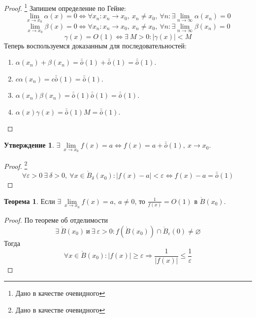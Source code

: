 \documentclass[a4paper, 12pt]{article}
\newcommand{\Bo}{\mathring{B}}
\renewcommand{\epsilon}{\varepsilon}
\renewcommand{\emptyset}{\varnothing}
\newcommand{\om}{\bar{\bar{o}}}
\theoremstyle{definition}
\newtheorem*{theorem}{Теорема}
\newtheorem*{statement}{Утверждение}
\begin{document}
        \begin{proof}\footnote{Дано в качестве очевидного}
            Запишем определение по Гейне:
            \[\lim\limits_{x\to x_0}\alpha(x)=0 \Leftrightarrow \forall x_n: x_n\to x_0,\ x_n\ne x_0,\ \forall n: \exists \lim\limits_{n\to \infty}\alpha(x_n)=0\]
            \[\lim\limits_{x\to x_0}\beta(x)=0 \Leftrightarrow \forall x_n: x_n\to x_0,\ x_n\ne x_0,\ \forall n: \exists \lim\limits_{n\to \infty}\beta(x_n)=0\]
            \[\gamma(x)=O(1) \Leftrightarrow \exists\ M>0: |\gamma(x)|<M\] 
            Теперь воспользуемся доказанным для последовательностей:
            \begin{enumerate}
                \item $\alpha(x_n)+\beta(x_n)=\bar{\bar{o}}{(1)}+\bar{\bar{o}}{(1)}=\bar{\bar{o}}{(1)}$.
                \item $c\alpha(x_n)=c \bar{\bar{o}}{(1)}=\bar{\bar{o}}{(1)}$.
                \item $\alpha(x_n)\beta(x_n)=\bar{\bar{o}}{(1)}\bar{\bar{o}}{(1)}=\bar{\bar{o}}{(1)}$.
                \item $\alpha(x)\gamma(x)=\bar{\bar{o}}{(1)}M=\bar{\bar{o}}{(1)}$.
            \end{enumerate}
        \end{proof} 
        \begin{statement}
            $\exists\ \lim\limits_{x\to x_0}f(x)=a\Leftrightarrow f(x)=a+\om(1),\ x\to x_0$.
        \end{statement} 
        \begin{proof}\footnote{Дано в качестве очевидного}
            \[\forall \epsilon>0\ \exists\ \delta>0,\ \forall x\in \mathring{B}_{\delta}(x_0): |f(x)-a|<\epsilon \Leftrightarrow f(x)-a=\bar{\bar{o}}{(1)}\]
        \end{proof}
        \begin{theorem}
            Если $\exists\ \lim\limits_{x\to x_0}f(x)=a,\ a\ne 0$, то $\frac{1}{f(x)}=O(1)$ в $\Bo(x_0)$.
        \end{theorem} 
        \begin{proof}
            По теореме об отделимости 
            \[\exists\ \Bo(x_0)\ \text{и}\ \exists\ \epsilon>0: f(\Bo(x_0))\cap \Bo_{\epsilon}(0)\ne \emptyset\] 
            Тогда 
            \[\forall x\in \Bo(x_0): |f(x)|\geq \epsilon \Rightarrow \frac{1}{|f(x)|}\leq \frac{1}{\epsilon}\]
        \end{proof} 
\end{document}

